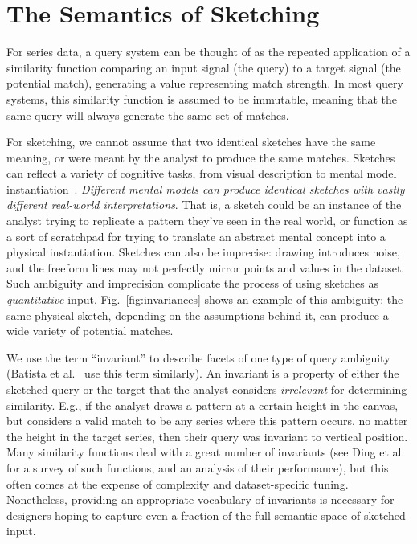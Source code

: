 \section{The Semantics of Sketching}
\label{sec:invariants}
For series data, a query system can be thought of as the repeated application of a similarity function comparing an input signal (the query) to a target signal (the potential match), generating a value representing match strength. In most query systems, this similarity function is assumed to be immutable, meaning that the same query will always generate the same set of matches.

For sketching, we cannot assume that two identical sketches have the same meaning, or were meant by the analyst to produce the same matches. Sketches can reflect a variety of cognitive tasks, from visual description to mental model instantiation~\cite{fish1990amplifying}.  \emph{Different mental models can produce identical sketches with vastly different real-world interpretations}. That is, a sketch could be an instance of the analyst trying to replicate a pattern they've seen in the real world, or function as a sort of scratchpad for trying to translate an abstract mental concept into a physical instantiation. Sketches can also be imprecise: drawing introduces noise, and the freeform lines may not perfectly mirror points and values in the dataset. Such ambiguity and imprecision complicate the process of using sketches as \emph{quantitative} input. Fig.~\ref{fig:invariances} shows an example of this ambiguity: the same physical sketch, depending on the assumptions behind it, can produce a wide variety of potential matches.

We use the term ``invariant'' to describe facets of one type of query ambiguity (Batista et al.~\cite{batista2011complexity} use this term similarly). An invariant is a property of either the sketched query or the target that the analyst considers \emph{irrelevant} for determining similarity. E.g., if the analyst draws a pattern at a certain height in the canvas, but considers a valid match to be any series where this pattern occurs, no matter the height in the target series, then their query was invariant to vertical position. Many similarity functions deal with a great number of invariants (see Ding et al.~\cite{ding2008querying} for a survey of such functions, and an analysis of their performance), but this often comes at the expense of complexity and dataset-specific tuning. Nonetheless, providing an appropriate vocabulary of invariants is necessary for designers hoping to capture even a fraction of the full semantic space of sketched input.

